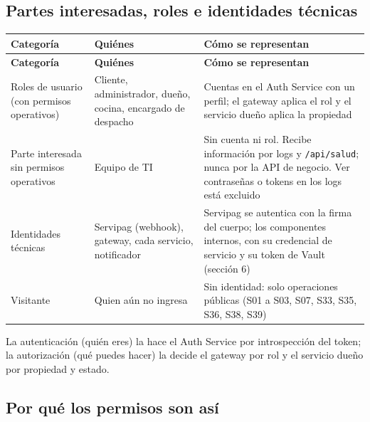 \subsection{Partes interesadas, roles e identidades técnicas}

{\small
\setlength{\tabcolsep}{3pt}\renewcommand{\arraystretch}{1.15}
\begin{longtable}{|>{\raggedright\arraybackslash}p{}|>{\raggedright\arraybackslash}p{}|>{\raggedright\arraybackslash}p{}|}
\hline
\textbf{Categoría} & \textbf{Quiénes} & \textbf{Cómo se representan} \\ \hline
\endfirsthead
\hline
\textbf{Categoría} & \textbf{Quiénes} & \textbf{Cómo se representan} \\ \hline
\endhead
Roles de usuario (con permisos operativos) & Cliente, administrador, dueño, cocina, encargado de despacho & Cuentas en el Auth Service con un perfil; el gateway aplica el rol y el servicio dueño aplica la propiedad \\ \hline
Parte interesada sin permisos operativos & Equipo de TI & Sin cuenta ni rol. Recibe información por logs y \texttt{/\allowbreak{}api/\allowbreak{}salud}; nunca por la API de negocio. Ver contraseñas o tokens en los logs está excluido \\ \hline
Identidades técnicas & Servipag (webhook), gateway, cada servicio, notificador & Servipag se autentica con la firma del cuerpo; los componentes internos, con su credencial de servicio y su token de Vault (sección 6) \\ \hline
Visitante & Quien aún no ingresa & Sin identidad: solo operaciones públicas (S01 a S03, S07, S33, S35, S36, S38, S39) \\ \hline
\end{longtable}
}

La autenticación (quién eres) la hace el Auth Service por introspección del token; la autorización (qué puedes hacer) la decide el gateway por rol y el servicio dueño por propiedad y estado.


\subsection{Por qué los permisos son así}

